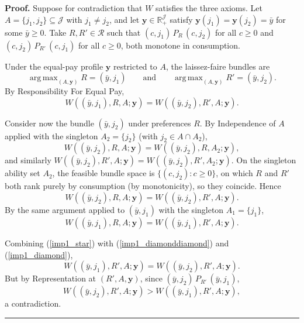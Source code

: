 \documentclass[12pt,thmsb]{article}
\DeclareMathOperator*{\argmax}{arg\,max}
\newenvironment{proof}[1][Proof]{\noindent \textbf{#1.} }{\  \rule{0.5em}{0.5em}}
\begin{document}
\begin{proof}
Suppose for contradiction that $W$ satisfies the three axioms. Let
$A=\{j_1,j_2\}\subseteq\mathcal J$ with $j_1\neq j_2$, and let
$\mathbf y\in\mathbb R_+^{\mathcal J}$ satisfy $\mathbf y(j_1)=\mathbf
y(j_2)=\bar y$ for some $\bar y\geq 0$. Take $R,R'\in\mathcal R$ such that
$(c,j_1)\,P_R\,(c,j_2)$ for all $c\geq 0$ and $(c,j_2)\,P_{R'}\,(c,j_1)$ for all
$c\geq 0$, both monotone in consumption.

Under the equal-pay profile $\mathbf y$ restricted to $A$, the laissez-faire
bundles are
\begin{equation*}
\argmax_{(A,\mathbf y)}R=(\bar y,j_1)
\qquad\text{and}\qquad
\argmax_{(A,\mathbf y)}R'=(\bar y,j_2).
\end{equation*}
By Responsibility For Equal Pay,
\begin{equation}
W((\bar y,j_1),R,A;\mathbf y)=W((\bar y,j_2),R',A;\mathbf y). \label{imp1_star}
\end{equation}

Consider now the bundle $(\bar y,j_2)$ under preferences $R$. By Independence of
$A$ applied with the singleton $A_2=\{j_2\}$ (with $j_2\in A\cap A_2$),
\begin{equation*}
W((\bar y,j_2),R,A;\mathbf y)=W((\bar y,j_2),R,A_2;\mathbf y),
\end{equation*}
and similarly $W((\bar y,j_2),R',A;\mathbf y)=W((\bar y,j_2),R',A_2;\mathbf y)$.
On the singleton ability set $A_2$, the feasible bundle space is
$\{(c,j_2):c\geq 0\}$, on which $R$ and $R'$ both rank purely by consumption (by
monotonicity), so they coincide. Hence
\begin{equation}
W((\bar y,j_2),R,A;\mathbf y)=W((\bar y,j_2),R',A;\mathbf y). \label{imp1_diamond}
\end{equation}
By the same argument applied to $(\bar y,j_1)$ with the singleton
$A_1=\{j_1\}$,
\begin{equation}
W((\bar y,j_1),R,A;\mathbf y)=W((\bar y,j_1),R',A;\mathbf y).
\label{imp1_diamonddiamond}
\end{equation}

Combining (\ref{imp1_star}) with (\ref{imp1_diamonddiamond}) and
(\ref{imp1_diamond}),
\begin{equation*}
W((\bar y,j_1),R',A;\mathbf y)=W((\bar y,j_2),R',A;\mathbf y).
\end{equation*}
But by Representation at $(R',A,\mathbf y)$, since $(\bar y,j_2)\,P_{R'}\,(\bar
y,j_1)$,
\begin{equation*}
W((\bar y,j_2),R',A;\mathbf y)>W((\bar y,j_1),R',A;\mathbf y),
\end{equation*}
a contradiction.
\end{proof}
\end{document}
